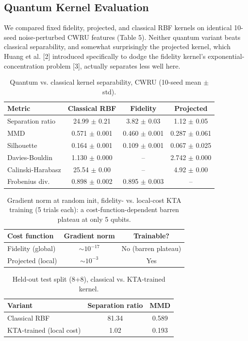 \documentclass[3p,times,procedia]{elsarticle}
\begin{document}
\subsection{Quantum Kernel Evaluation}
We compared fixed fidelity, projected, and classical RBF kernels on identical 10-seed noise-perturbed CWRU features (Table 5). Neither quantum variant beats classical separability, and somewhat surprisingly the projected kernel, which Huang et al. [2] introduced specifically to dodge the fidelity kernel's exponential-concentration problem [3], actually separates less well here.

\begin{table}[ht]
\caption{Quantum vs. classical kernel separability, CWRU (10-seed mean $\pm$ std).}
\centering
\begin{tabular}{lccc}
\toprule
\textbf{Metric} & \textbf{Classical RBF} & \textbf{Fidelity} & \textbf{Projected} \\
\midrule
Separation ratio & 24.99 $\pm$ 0.21 & 3.82 $\pm$ 0.03 & 1.12 $\pm$ 0.05 \\
MMD & 0.571 $\pm$ 0.001 & 0.460 $\pm$ 0.001 & 0.287 $\pm$ 0.061 \\
Silhouette & 0.164 $\pm$ 0.001 & 0.109 $\pm$ 0.001 & 0.067 $\pm$ 0.025 \\
Davies-Bouldin & 1.130 $\pm$ 0.000 & -- & 2.742 $\pm$ 0.000 \\
Calinski-Harabasz & 25.54 $\pm$ 0.00 & -- & 4.92 $\pm$ 0.00 \\
Frobenius div. & 0.898 $\pm$ 0.002 & 0.895 $\pm$ 0.003 & -- \\
\bottomrule
\end{tabular}
\end{table}

\begin{table}[ht]
\caption{Gradient norm at random init, fidelity- vs. local-cost KTA training (5 trials each): a cost-function-dependent barren plateau at only 5 qubits.}
\centering
\begin{tabular}{lcc}
\toprule
\textbf{Cost function} & \textbf{Gradient norm} & \textbf{Trainable?} \\
\midrule
Fidelity (global) & $\sim 10^{-17}$ & No (barren plateau) \\
Projected (local) & $\sim 10^{-3}$ & Yes \\
\bottomrule
\end{tabular}
\end{table}

\begin{table}[ht]
\caption{Held-out test split (8+8), classical vs. KTA-trained kernel.}
\centering
\begin{tabular}{lcc}
\toprule
\textbf{Variant} & \textbf{Separation ratio} & \textbf{MMD} \\
\midrule
Classical RBF & 81.34 & 0.589 \\
KTA-trained (local cost) & 1.02 & 0.193 \\
\bottomrule
\end{tabular}
\end{table}
\end{document}
